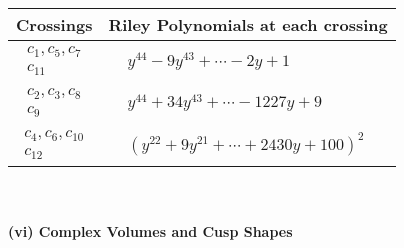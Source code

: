 \documentclass[1p]{elsarticle_modified}
\theoremstyle{definition}
\begin{document}
\begin{tabular}{m{50pt}|m{274pt}}
Crossings & \hspace{64pt}Riley Polynomials at each crossing \\
\hline $$\begin{aligned}c_{1},c_{5},c_{7}\\c_{11}\end{aligned}$$&$\begin{aligned}
&y^{44}-9 y^{43}+\cdots-2 y+1
\end{aligned}$\\
\hline $$\begin{aligned}c_{2},c_{3},c_{8}\\c_{9}\end{aligned}$$&$\begin{aligned}
&y^{44}+34 y^{43}+\cdots-1227 y+9
\end{aligned}$\\
\hline $$\begin{aligned}c_{4},c_{6},c_{10}\\c_{12}\end{aligned}$$&$\begin{aligned}
&(y^{22}+9 y^{21}+\cdots+2430 y+100)^{2}
\end{aligned}$\\
\hline
\end{tabular}\\~\\
\newpage\flushleft \textbf{(vi) Complex Volumes and Cusp Shapes}
\end{document}
